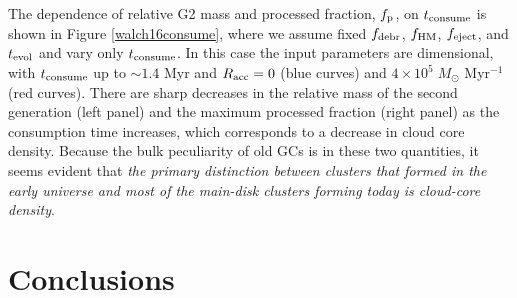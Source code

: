 \documentclass[12pt,preprint]{aastex}
\begin{document}
The dependence of relative G2 mass and processed fraction, $f_{\rm p}$, on $t_{\rm
consume}$ is shown in Figure \ref{walch16consume}, where we assume fixed $f_{\rm
debr}$, $f_{\rm HM}$, $f_{\rm eject}$, and $t_{\rm evol}$ and vary only $t_{\rm
consume}$.  In this case the input parameters are dimensional, with $t_{\rm
consume}$ up to $\sim1.4$ Myr and $R_{\rm acc}=0$ (blue curves) and
$4\times10^5\;M_\odot$ Myr$^{-1}$ (red curves). There are sharp decreases in the
relative mass of the second generation (left panel) and the maximum processed
fraction (right panel) as the consumption time increases, which corresponds to a
decrease in cloud core density. Because the bulk peculiarity of old GCs is in these
two quantities, it seems evident that {\it the primary distinction between clusters
that formed in the early universe and most of the main-disk clusters forming today
is cloud-core density}.


\section{Conclusions}
\label{conclu}
\end{document}
